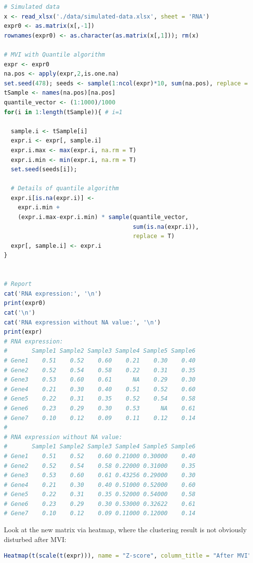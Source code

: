 \documentclass[
  12pt,
]{book}
\begin{document}
\begin{lstlisting}[language=R]
# Simulated data
x <- read_xlsx('./data/simulated-data.xlsx', sheet = 'RNA')
expr0 <- as.matrix(x[,-1])
rownames(expr0) <- as.character(as.matrix(x[,1])); rm(x)

# MVI with Quantile algorithm
expr <- expr0
na.pos <- apply(expr,2,is.one.na)
set.seed(478); seeds <- sample(1:ncol(expr)*10, sum(na.pos), replace = F)
tSample <- names(na.pos)[na.pos]
quantile_vector <- (1:1000)/1000
for(i in 1:length(tSample)){ # i=1
  
  sample.i <- tSample[i]
  expr.i <- expr[, sample.i]
  expr.i.max <- max(expr.i, na.rm = T)
  expr.i.min <- min(expr.i, na.rm = T)
  set.seed(seeds[i]);
  
  # Details of quantile algorithm
  expr.i[is.na(expr.i)] <-
    expr.i.min +
    (expr.i.max-expr.i.min) * sample(quantile_vector,
                                     sum(is.na(expr.i)),
                                     replace = T)
  expr[, sample.i] <- expr.i
}
  

# Report
cat('RNA expression:', '\n')
print(expr0)
cat('\n')
cat('RNA expression without NA value:', '\n')
print(expr)
# RNA expression: 
#       Sample1 Sample2 Sample3 Sample4 Sample5 Sample6
# Gene1    0.51    0.52    0.60    0.21    0.30    0.40
# Gene2    0.52    0.54    0.58    0.22    0.31    0.35
# Gene3    0.53    0.60    0.61      NA    0.29    0.30
# Gene4    0.21    0.30    0.40    0.51    0.52    0.60
# Gene5    0.22    0.31    0.35    0.52    0.54    0.58
# Gene6    0.23    0.29    0.30    0.53      NA    0.61
# Gene7    0.10    0.12    0.09    0.11    0.12    0.14
# 
# RNA expression without NA value: 
#       Sample1 Sample2 Sample3 Sample4 Sample5 Sample6
# Gene1    0.51    0.52    0.60 0.21000 0.30000    0.40
# Gene2    0.52    0.54    0.58 0.22000 0.31000    0.35
# Gene3    0.53    0.60    0.61 0.43256 0.29000    0.30
# Gene4    0.21    0.30    0.40 0.51000 0.52000    0.60
# Gene5    0.22    0.31    0.35 0.52000 0.54000    0.58
# Gene6    0.23    0.29    0.30 0.53000 0.32622    0.61
# Gene7    0.10    0.12    0.09 0.11000 0.12000    0.14
\end{lstlisting}

Look at the new matrix via heatmap, where the clustering result is not obviously disturbed after MVI:

\begin{lstlisting}[language=R]
Heatmap(t(scale(t(expr))), name = "Z-score", column_title = "After MVI")
\end{lstlisting}
\end{document}
